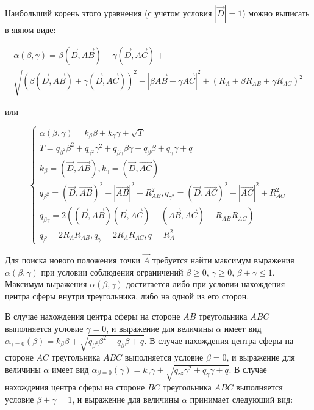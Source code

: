 \documentclass[
11pt,%
tightenlines,%
twoside,%
onecolumn,%
nofloats,%
nobibnotes,%
nofootinbib,%
superscriptaddress,%
noshowpacs,%
centertags]%
{revtex4}
\begin{document}
Наибольший корень этого уравнения (с учетом условия $|\vec{D}| = 1$) можно выписать в явном виде:

\begin{multline}
\alpha(\beta, \gamma) = \beta (\vec{D}, \vec{AB}) + \gamma (\vec{D}, \vec{AC}) + \\
\sqrt{(\beta (\vec{D}, \vec{AB}) + \gamma (\vec{D}, \vec{AC}))^2 - |\beta \vec{AB} + \gamma \vec{AC}|^2 + (R_A + \beta R_{AB} + \gamma R_{AC})^2}
\end{multline}

или

\begin{equation}
\begin{cases}
\alpha(\beta, \gamma) = k_{\beta} \beta + k_{\gamma} \gamma + \sqrt{T} \\
T = q_{\beta^2} \beta^2 + q_{\gamma^2} \gamma^2 + q_{\beta \gamma} \beta \gamma + q_{\beta} \beta + q_{\gamma} \gamma + q \\
k_{\beta} = (\vec{D}, \vec{AB}), k_{\gamma} = (\vec{D}, \vec{AC}) \\
q_{\beta^2} = (\vec{D}, \vec{AB})^2 - |\vec{AB}|^2 + R_{AB}^2, q_{\gamma^2} = (\vec{D}, \vec{AC})^2 - |\vec{AC}|^2 + R_{AC}^2 \\
q_{\beta \gamma} = 2 ((\vec{D}, \vec{AB})(\vec{D}, \vec{AC}) - (\vec{AB}, \vec{AC}) + R_{AB} R_{AC}) \\
q_{\beta} = 2 R_A R_{AB}, q_{\gamma} = 2 R_A R_{AC}, q = R_A^2
\end{cases}
\end{equation}

Для поиска нового положения точки $\vec{A}$ требуется найти максимум выражения $\alpha(\beta, \gamma)$ при условии соблюдения ограничений $\beta \ge 0$, $\gamma \ge 0$, $\beta + \gamma \le 1$.
Максимум выражения $\alpha(\beta, \gamma)$ достигается либо при условии нахождения центра сферы внутри треугольника, либо на одной из его сторон.

В случае нахождения центра сферы на стороне $AB$ треугольника $ABC$ выполняется условие $\gamma = 0$, и выражение для величины $\alpha$ имеет вид $\alpha_{\gamma = 0}(\beta) = k_{\beta} \beta + \sqrt{q_{\beta^2} \beta^2 + q_{\beta} \beta + q}$.
В случае нахождения центра сферы на стороне $AC$ треугольника $ABC$ выполняется условие $\beta = 0$, и выражение для величины $\alpha$ имеет вид $\alpha_{\beta = 0}(\gamma) = k_{\gamma} \gamma + \sqrt{q_{\gamma^2} \gamma^2 + q_{\gamma} \gamma + q}$.
В случае нахождения центра сферы на стороне $BC$ треугольника $ABC$ выполняется условие $\beta + \gamma = 1$, и выражение для величины $\alpha$ принимает следующий вид:
\end{document}
